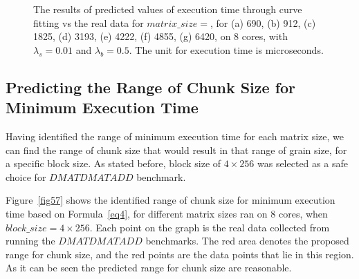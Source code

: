 \begin{figure}[H]
{	\label{fig56:g}}
	\caption{The results of predicted values of execution time through curve fitting vs the real data for $matrix\_size=$, for (a) 690, (b) 912, (c) 1825, (d) 3193, (e) 4222, (f) 4855, (g) 6420, on 8 cores, with $\lambda_{s}=0.01$ and $\lambda_{b}=0.5$. The unit for execution time is microseconds.}
	\label{fig56}	
\end{figure}


\subsection{Predicting the Range of Chunk Size for Minimum Execution Time}
Having identified the range of minimum execution time for each matrix size, we can find the range of chunk size that would result in that range of grain size, for a specific block size.
As stated before, block size of $4\times{256}$ was selected as a safe choice for $DMATDMATADD$ benchmark. 


Figure~\ref{fig57} shows the identified range of chunk size for minimum execution time based on Formula~\ref{eq4}, for different matrix sizes ran on 8 cores, when $block\_{size}=4\times{256}$. Each point on the graph is the real data collected from running the $DMATDMATADD$ benchmarks. The red area denotes the proposed range for chunk size, and the red points are the data points that lie in this region. As it can be seen the predicted range for chunk size are reasonable.   

